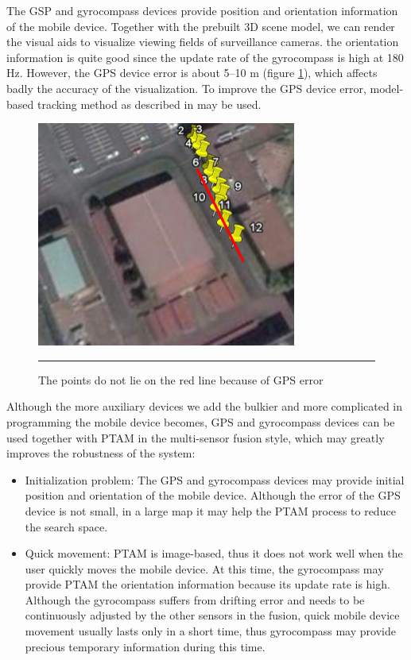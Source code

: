 The GSP and gyrocompass devices provide position and orientation information of the mobile device. Together with the prebuilt 3D scene model, we can render the visual aids to visualize viewing fields of surveillance cameras. the orientation information is quite good since the update rate of the gyrocompass is high at 180 Hz. However, the GPS device error is about 5--10 m (figure \ref{fig:GPSError}), which affects badly the accuracy of the visualization. To improve the GPS device error, model-based tracking method as described in \cite{Reference13} may be used.

\begin{figure}[htbp]
	\centering
	\includegraphics{./Primitives/gps_error.png}
	\rule{35em}{0.5pt}
	\caption[GPS error]{The points do not lie on the red line because of GPS error}
	\label{fig:GPSError}
\end{figure}

Although the more auxiliary devices we add the bulkier and more complicated in programming the mobile device becomes, GPS and gyrocompass devices can be used together with PTAM in the multi-sensor fusion \cite{Reference14} style, which may greatly improves the robustness of the system:

\begin{itemize}
	\item Initialization problem: The GPS and gyrocompass devices may provide initial position and orientation of the mobile device. Although the error of the GPS device is not small, in a large map it may help the PTAM process to reduce the search space.
	\item Quick movement: PTAM is image-based, thus it does not work well when the user quickly moves the mobile device. At this time, the gyrocompass may provide PTAM the orientation information because its update rate is high. Although the gyrocompass suffers from drifting error and needs to be continuously adjusted by the other sensors in the fusion, quick mobile device movement usually lasts only in a short time, thus gyrocompass may provide precious temporary information during this time.
\end{itemize}

